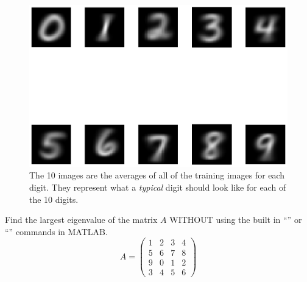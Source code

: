 \begin{figure}
    \begin{center}
        \includegraphics[width=0.9\columnwidth]{mnist_average_training_image.eps}
    \end{center}
    \caption{The 10 images are the averages of all of the training images for each digit.
        They represent what a {\it typical} digit should look like for each of the 10
    digits.}
    \label{fig:mnist_average}
\end{figure}




\begin{problem}
    Find the largest eigenvalue of the matrix $A$ WITHOUT using the built in
    ``'' or ``'' commands in MATLAB.
    \[ A = \begin{pmatrix} 1 & 2 & 3 & 4 \\ 5 & 6 & 7 & 8 \\ 9 & 0 & 1 & 2 \\ 3 & 4 & 5 &
        6 \end{pmatrix} \]
\end{problem}


